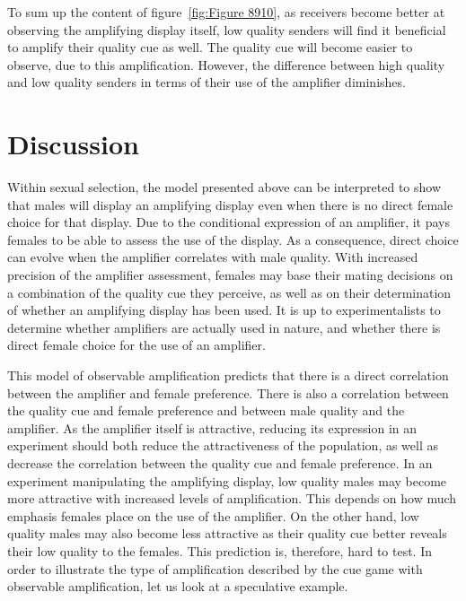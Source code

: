 \documentclass[a4paper,12pt]{article}
\numberwithin{equation}{section}
\begin{document}
To sum up the content of figure~\ref{fig:Figure 8910}, as receivers become better at observing the amplifying display itself, low quality senders will find it beneficial to amplify their quality cue as well. The quality cue will become easier to observe, due to this amplification. However, the difference between high quality and low quality senders in terms of their use of the amplifier diminishes.

\newpage


\section{Discussion}
\label{sec:Discussion}

Within sexual selection, the model presented above can be interpreted to show that males will display an amplifying display even when there is no direct female choice for that display. Due to the conditional expression of an amplifier, it pays females to be able to assess the use of the display. As a consequence, direct choice can evolve when the amplifier correlates with male quality. With increased precision of the amplifier assessment, females may base their mating decisions on a combination of the quality cue they perceive, as well as on their determination of whether an amplifying display has been used. It is up to experimentalists to determine whether amplifiers are actually used in nature, and whether there is direct female choice for the use of an amplifier. 

This model of observable amplification predicts that there is a direct correlation between the amplifier and female preference. There is also a correlation between the quality cue and female preference and between male quality and the amplifier. As the amplifier itself is attractive, reducing its expression in an experiment should both reduce the attractiveness of the population, as well as decrease the correlation between the quality cue and female preference. In an experiment manipulating the amplifying display, low quality males may become more attractive with increased levels of amplification. This depends on how much emphasis females place on the use of the amplifier. On the other hand, low quality males may also become less attractive as their quality cue better reveals their low quality to the females. This prediction is, therefore, hard to test. In order to illustrate the type of amplification described by the cue game with observable amplification, let us look at a speculative example.
\end{document}
